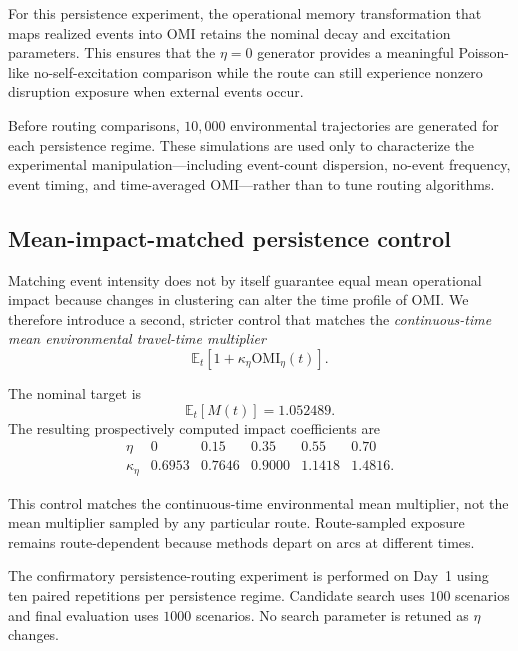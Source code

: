\documentclass[preprint,12pt]{elsarticle}
\newcommand{\1}{\mathbf{1}}
\begin{document}
For this persistence experiment, the operational memory transformation that
maps realized events into OMI retains the nominal decay and excitation
parameters. This ensures that the $\eta=0$ generator provides a meaningful
Poisson-like no-self-excitation comparison while the route can still experience
nonzero disruption exposure when external events occur.

Before routing comparisons, $10{,}000$ environmental trajectories are generated
for each persistence regime. These simulations are used only to characterize
the experimental manipulation---including event-count dispersion, no-event
frequency, event timing, and time-averaged OMI---rather than to tune routing
algorithms.

\subsection{Mean-impact-matched persistence control}
\label{subsec:mean_impact_control}

Matching event intensity does not by itself guarantee equal mean operational
impact because changes in clustering can alter the time profile of OMI.
We therefore introduce a second, stricter control that matches the
\emph{continuous-time mean environmental travel-time multiplier}
\begin{equation}
	\mathbb{E}_t
	\left[
	1+\kappa_{\eta}\mathrm{OMI}_{\eta}(t)
	\right].
	\label{eq:mean_multiplier_control}
\end{equation}

The nominal target is
\[
\mathbb{E}_t[M(t)]
=
1.052489.
\]
The resulting prospectively computed impact coefficients are
\begin{equation}
	\begin{array}{c|ccccc}
		\eta
		&0
		&0.15
		&0.35
		&0.55
		&0.70\\
		\hline
		\kappa_{\eta}
		&0.6953
		&0.7646
		&0.9000
		&1.1418
		&1.4816.
	\end{array}
	\label{eq:kappa_matched_values}
\end{equation}

This control matches the continuous-time environmental mean multiplier, not the
mean multiplier sampled by any particular route. Route-sampled exposure remains
route-dependent because methods depart on arcs at different times.

The confirmatory persistence-routing experiment is performed on Day~1 using ten
paired repetitions per persistence regime. Candidate search uses $100$
scenarios and final evaluation uses $1000$ scenarios. No search parameter is
retuned as $\eta$ changes.
\end{document}
